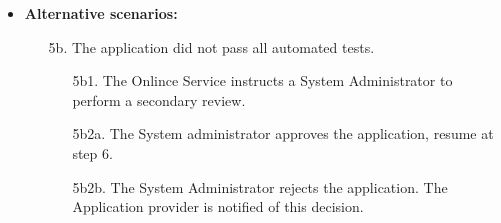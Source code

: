 \documentclass[english,peerreview]{sareport}
\begin{document}
\begin{itemize}
    \item \textbf{Alternative scenarios:} 
    \begin{enumerate}
        \item [5b.] The application did not pass all automated tests.
	\begin{enumerate}
		\item [5b1.] The Onlince Service instructs a System Administrator to perform a secondary review.
		\item [5b2a.] The System administrator approves the application, resume at step 6.
		\item [5b2b.] The System Administrator rejects the application. The Application provider is notified of this decision.
	\end{enumerate}
    \end{enumerate}
\end{itemize}
\end{document}
